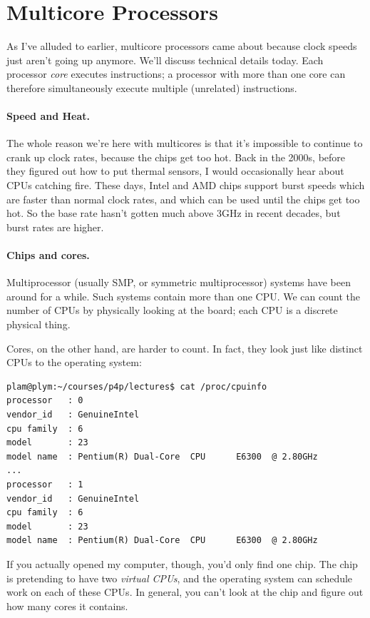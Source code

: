 




\section*{Multicore Processors}
As I've alluded to earlier, multicore processors came about because
clock speeds just aren't going up anymore. We'll discuss technical
details today. Each processor \emph{core} executes instructions; a processor with more than one core can therefore simultaneously execute multiple
(unrelated) instructions.

\vspace*{-1em}
\paragraph{Speed and Heat.}
The whole reason we're here with multicores is that it's impossible to continue to
crank up clock rates, because the chips get too hot. Back in the 2000s, before
they figured out how to put thermal sensors, I would occasionally hear about CPUs catching fire.
These days, Intel and AMD chips support burst speeds which are faster than normal clock rates,
and which can be used until the chips get too hot. So the base rate hasn't gotten much above 3GHz
in recent decades, but burst rates are higher.

\paragraph{Chips and cores.} Multiprocessor (usually SMP, or symmetric
multiprocessor) systems have been around for a while. Such systems
contain more than one CPU. We can count the number of CPUs by
physically looking at the board; each CPU is a discrete physical thing.

Cores, on the other hand, are harder to count. In fact, they look just
like distinct CPUs to the operating system:

{\scriptsize \begin{verbatim}
plam@plym:~/courses/p4p/lectures$ cat /proc/cpuinfo
processor	: 0
vendor_id	: GenuineIntel
cpu family	: 6
model		: 23
model name	: Pentium(R) Dual-Core  CPU      E6300  @ 2.80GHz
...
processor	: 1
vendor_id	: GenuineIntel
cpu family	: 6
model		: 23
model name	: Pentium(R) Dual-Core  CPU      E6300  @ 2.80GHz
\end{verbatim}
}
\vspace*{-1em}
If you actually opened my computer, though, you'd only find one chip.
The chip is pretending to have two \emph{virtual CPUs}, and the
operating system can schedule work on each of these CPUs. In general,
you can't look at the chip and figure out how many cores it contains.

